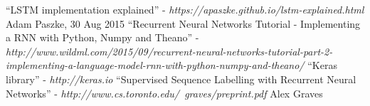 \documentclass[twoside]{article}
\begin{document}
\begin{multicols}{2}

\begin{thebibliography}{99} %

    ``LSTM implementation explained'' - \emph{https://apaszke.github.io/lstm-explained.html} Adam Paszke, 30 Aug 2015
    ``Recurrent Neural Networks Tutorial - Implementing a RNN with Python, Numpy and Theano'' - \emph{http://www.wildml.com/2015/09/recurrent-neural-networks-tutorial-part-2-implementing-a-language-model-rnn-with-python-numpy-and-theano/}
    ``Keras library'' - \emph{http://keras.io}
    ``Supervised Sequence Labelling with Recurrent Neural Networks'' - \emph{http://www.cs.toronto.edu/~graves/preprint.pdf} Alex Graves
\end{thebibliography}


\end{multicols}
\end{document}
